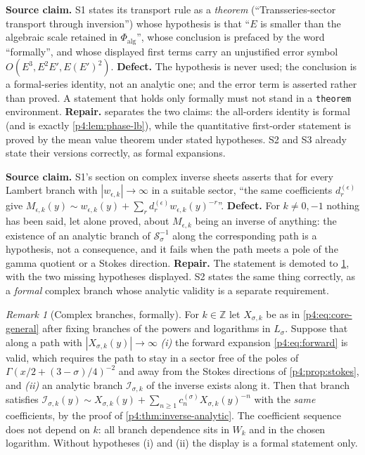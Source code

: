 \documentclass[11pt,a4paper,oneside]{book}
\theoremstyle{plain}
\theoremstyle{definition}
\theoremstyle{remark}
\newtheorem{remark}[theorem]{Remark}
\newcommand{\Int}{\mathbb{Z}}
\newcommand{\Wlam}{W}
\newcommand{\Xcore}{X}
\begin{document}
\begin{repairbox}
\textbf{Source claim.}  \textsf{S1} states its transport rule as a
\emph{theorem} (``Transseries-sector transport through inversion'') whose
hypothesis is that ``$E$ is smaller than the algebraic scale retained in
$\Phi_{\mathrm{alg}}$'', whose conclusion is prefaced by the word
``formally'', and whose displayed first terms carry an unjustified error
symbol $O(E^{3},E^{2}E',E(E')^{2})$.  \textbf{Defect.}  The hypothesis is
never used; the conclusion is a formal-series identity, not an analytic one;
and the error term is asserted rather than proved.  A statement that holds
only formally must not stand in a \texttt{theorem} environment.
\textbf{Repair.}   separates the two claims:
the all-orders identity is formal (and is exactly \cref{p4:lem:phase-lb}),
while the quantitative first-order statement is proved by the mean value
theorem under stated hypotheses.  \textsf{S2} and \textsf{S3} already state
their versions correctly, as formal expansions.
\end{repairbox}

\begin{repairbox}
\textbf{Source claim.}  \textsf{S1}'s section on complex inverse sheets
asserts that for every Lambert branch with $|w_{\epsilon,k}|\to\infty$ in a
suitable sector, ``the same coefficients $d^{(\epsilon)}_r$ give
$M_{\epsilon,k}(y)\sim w_{\epsilon,k}(y)+\sum_r d^{(\epsilon)}_r
w_{\epsilon,k}(y)^{-r}$''.  \textbf{Defect.}  For $k\ne0,-1$ nothing has been
said, let alone proved, about $M_{\epsilon,k}$ being an inverse of anything:
the existence of an analytic branch of $\mathcal S_\sigma^{-1}$ along the
corresponding path is a hypothesis, not a consequence, and it fails when the
path meets a pole of the gamma quotient or a Stokes direction.
\textbf{Repair.}  The statement is demoted to
\cref{p4:rem:complex-branches}, with the two missing hypotheses displayed.
\textsf{S2} states the same thing correctly, as a \emph{formal} complex branch
whose analytic validity is a separate requirement.
\end{repairbox}

\begin{remark}[Complex branches, formally]
\label{p4:rem:complex-branches}
For $k\in\Int$ let $\Xcore_{\sigma,k}$ be as in \cref{p4:eq:core-general}
after fixing branches of the powers and logarithms in $L_\sigma$.  Suppose
that along a path with $|\Xcore_{\sigma,k}(y)|\to\infty$ \emph{(i)} the
forward expansion \cref{p4:eq:forward} is valid, which requires the path to
stay in a sector free of the poles of $\Gamma(x/2+(3-\sigma)/4)^{-2}$ and away
from the Stokes directions of \cref{p4:prop:stokes}, and \emph{(ii)} an
analytic branch $\mathcal I_{\sigma,k}$ of the inverse exists along it.  Then
that branch satisfies
$\mathcal I_{\sigma,k}(y)\sim \Xcore_{\sigma,k}(y)
 +\sum_{n\ge1}c^{(\sigma)}_n\Xcore_{\sigma,k}(y)^{-n}$
with the \emph{same} coefficients, by the proof of
\cref{p4:thm:inverse-analytic}.  The coefficient sequence does not depend on
$k$: all branch dependence sits in $\Wlam_k$ and in the chosen logarithm.
Without hypotheses (i) and (ii) the display is a formal statement only.
\end{remark}
\end{document}
